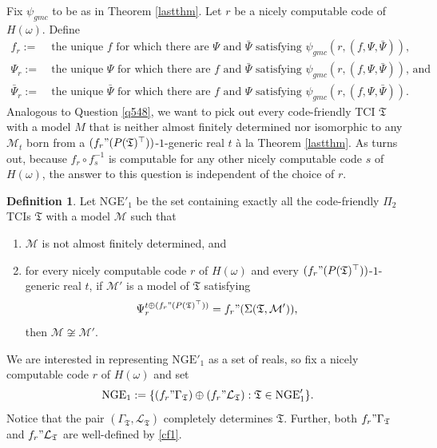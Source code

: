 \documentclass[12pt, twoside]{memoir}
\numberwithin{equation}{section}
\theoremstyle{definition}
\newtheorem{defi}[thm]{Definition}
\theoremstyle{remark}
\theoremstyle{definition}
\theoremstyle{definition}
\theoremstyle{definition}
\theoremstyle{remark}
\begin{document}
Fix $\psi_{gmc}$ to be as in Theorem \ref{lastthm}. Let $r$ be a nicely computable code of $H(\omega)$. Define
\begin{align*}
    f_r := \ & \text{the unique } f \text{ for which there are } \Psi \text{ and } \bar{\Psi} \text{ satisfying } \psi_{gmc}(r, (f, \Psi, \bar{\Psi})) \text{,} \\
    \Psi_r := \ & \text{the unique } \Psi \text{ for which there are } f \text{ and } \bar{\Psi} \text{ satisfying } \psi_{gmc}(r, (f, \Psi, \bar{\Psi})) \text{, and} \\
    \bar{\Psi}_r := \ & \text{the unique } \bar{\Psi} \text{ for which there are } f \text{ and } \Psi \text{ satisfying } \psi_{gmc}(r, (f, \Psi, \bar{\Psi})) \text{.}
\end{align*}
Analogous to Question \ref{q548}, we want to pick out every code-friendly TCI $\mathfrak{T}$ with a model $M$ that is neither almost finitely determined nor isomorphic to any $\mathcal{M}_t$ born from a $(f_r" (P(\mathfrak{T})^{\top}))$-$1$-generic real $t$ \`{a} la Theorem \ref{lastthm}. As turns out, because $f_r \circ f_s^{-1}$ is computable for any other nicely computable code $s$ of $H(\omega)$, the answer to this question is independent of
the choice of $r$.

\begin{defi}
Let $\mathrm{NGE}'_1$ be the set containing exactly all the code-friendly $\Pi_2$ TCIs $\mathfrak{T}$ with a model $\mathcal{M}$ such that
\begin{enumerate}[label=(\alph*)]
    \item $\mathcal{M}$ is not almost finitely determined, and
    \item for every nicely computable code $r$ of $H(\omega)$ and every $(f_r" (P(\mathfrak{T})^{\top}))$-$1$-generic real $t$, if $\mathcal{M}'$ is a model of $\mathfrak{T}$ satisfying 
    \begin{equation*}
        \Psi_r^{t \oplus (f_r" (P(\mathfrak{T})^{\top}))} = f_r" (\Sigma(\mathfrak{T}, \mathcal{M}')) \text{,}
    \end{equation*}
    then $\mathcal{M} \not \cong \mathcal{M}'$.
\end{enumerate}
\end{defi}

We are interested in representing $\mathrm{NGE}'_1$ as a set of reals, so fix a nicely computable code $r$ of $H(\omega)$ and set
\begin{equation*}
    \mathrm{NGE}_1 := \{(f_r" \Gamma_{\mathfrak{T}}) \oplus (f_r" \mathcal{L}_{\mathfrak{T}}) : \mathfrak{T} \in \mathrm{NGE}'_1\} \text{.}
\end{equation*}
Notice that the pair $(\Gamma_{\mathfrak{T}}, \mathcal{L}_{\mathfrak{T}})$ completely determines $\mathfrak{T}$. Further, both $f_r" \Gamma_{\mathfrak{T}}$ and $f_r" \mathcal{L}_{\mathfrak{T}}$ are well-defined by \ref{cf1}.
\end{document}

